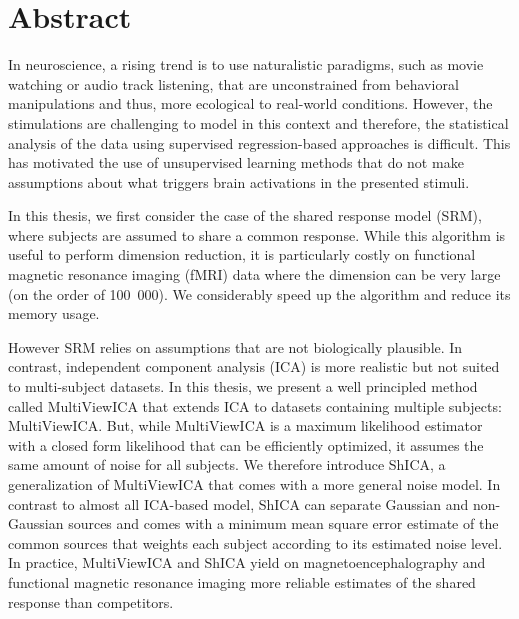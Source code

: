 \begingroup
\let\clearpage\relax
\let\cleardoublepage\relax
\let\cleardoublepage\relax

\chapter*{Abstract}
In neuroscience, a rising trend is to use naturalistic paradigms, such as movie
watching or audio track listening, that are
unconstrained from behavioral manipulations and thus, more ecological to
real-world conditions.
However, the stimulations are challenging to model in this context and therefore,
the statistical analysis of the data using supervised regression-based
approaches is difficult.
This has motivated the use of unsupervised learning methods that do not make
assumptions about what triggers brain activations in the presented stimuli.

In this thesis, we first consider the case of the shared response model (SRM), where
subjects are assumed to share a common response. While this algorithm is useful
to perform dimension reduction, it is particularly costly on functional magnetic
resonance imaging (fMRI) data where the
dimension can be very large (on the order of 100~000). We considerably speed up the
algorithm and reduce its memory usage.

However SRM relies on assumptions that are not biologically plausible. In
contrast, independent component analysis (ICA) is more realistic but not suited
to multi-subject datasets. In this thesis, we present a well principled method
called MultiViewICA that extends ICA to datasets containing multiple subjects: MultiViewICA.
But, while MultiViewICA is a maximum likelihood estimator with a closed form likelihood
that can be efficiently optimized, it assumes the same amount of noise for all
subjects.
We therefore introduce ShICA, a generalization of MultiViewICA that comes with a
more general noise model. In contrast to almost all ICA-based model, ShICA can
separate Gaussian and non-Gaussian sources and comes with a minimum mean square
error estimate of the common sources that weights each subject according to its
estimated noise level.
In practice, MultiViewICA and ShICA yield on magnetoencephalography and
functional magnetic resonance imaging  more reliable estimates
of the shared response than competitors.

